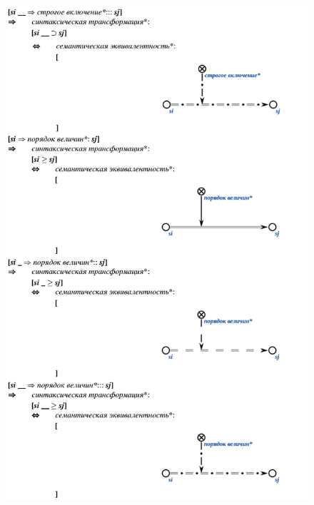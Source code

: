 \newpage
\begin{figure}[h]
	\includegraphics[scale=0.5]{images/intro/scs/sc.s-connectors/examples/example_2.png}
\end{figure}

